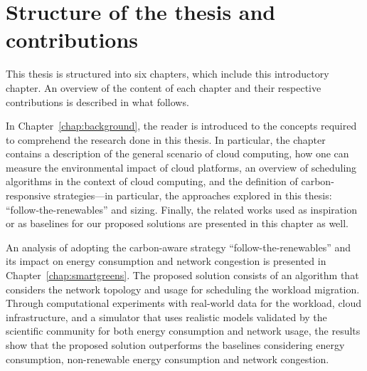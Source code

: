 \section{Structure of the thesis and contributions}

This thesis is structured into six chapters, which include this introductory chapter. An overview of the content of each chapter and their respective contributions is described in what follows.

In Chapter~\ref{chap:background}, the reader is introduced to the concepts required to comprehend the research done in this thesis. In particular, the chapter contains a description of the general scenario of cloud computing, how one can measure the environmental impact of cloud platforms, an overview of scheduling algorithms in the context of cloud computing, and the definition of carbon-responsive strategies---in particular, the approaches explored in this thesis: ``follow-the-renewables'' and sizing. Finally, the related works used as inspiration or as baselines for our proposed solutions are presented in this chapter as well.


An analysis of adopting the carbon-aware strategy ``follow-the-renewables'' and its impact on energy consumption and network congestion is presented in Chapter~\ref{chap:smartgreens}. The proposed solution consists of an algorithm that considers the network topology and usage for scheduling the workload migration. Through computational experiments with real-world data for the workload, cloud infrastructure, and a simulator that uses realistic models validated by the scientific community for both energy consumption and network usage, the results show that the proposed solution outperforms the baselines considering energy consumption, non-renewable energy consumption and network congestion.

